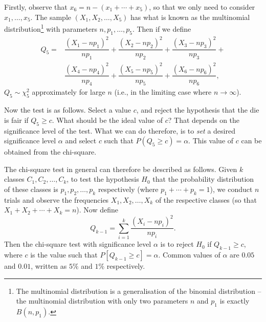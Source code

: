 \documentclass[svgnames, a5paper]{article}
\theoremstyle{definition}
\theoremstyle{remark}
\begin{document}
Firstly, observe that $x_6 = n - (x_1 + \cdots + x_5)$, so that we only need to consider $x_1, \ldots, x_5$. The sample $(X_1, X_2, \ldots, X_5)$ has what is known as the multinomial distribution\footnote{
	The multinomial distribution is a generalisation of the binomial distribution -- the multinomial distribution with only two parameters $n$ and $p_1$ is exactly $B(n, p_1)$.
} with parameters $n, p_1, \ldots, p_5$. Then if we define
\begin{align*}
Q_5 ={} &  \dfrac{(X_1 - np_1)^2}{np_1} + \dfrac{(X_2 - np_2)^2}{np_2} + \dfrac{(X_3 - np_3)^2}{np_3} + {}\\
 & \dfrac{(X_4 - np_4)^2}{np_4} + \dfrac{(X_5 - np_5)^2}{np_5} + \dfrac{(X_6 - np_6)^2}{np_6},
\end{align*}
$Q_5 \sim \chi^2_5$ approximately for large $n$ (i.e., in the limiting case where $n \to \infty$).

Now the test is as follows. Select a value $c$, and reject the hypothesis that the die is fair if $Q_5 \ge c$. What should be the ideal value of $c$? That depends on the significance level of the test. What we can do therefore, is to \emph{set} a desired significance level $\alpha$ and select $c$ such that $P(Q_5 \ge c) = \alpha$. This value of $c$ can be obtained from the chi-square.

The chi-square test in general can therefore be described as follows. Given $k$ classes $C_1, C_2, \ldots, C_k$, to test the hypothesis $H_0$ that the probability distribution of these classes is $p_1, p_2, \ldots, p_k$ respectively (where $p_1 + \cdots + p_k = 1$), we conduct $n$ trials and observe the frequencies $X_1, X_2, \ldots, X_k$ of the respective classes (so that $X_1 + X_2 + \cdots + X_k = n$). Now define
\begin{equation*}
Q_{k - 1} = \sum_{i=1}^{k} \dfrac{(X_i - np_i)^2}{np_i}.
\end{equation*}
Then the chi-square test with significance level $\alpha$ is to reject $H_0$ if $Q_{k - 1} \ge c$, where $c$ is the value such that $P[Q_{k - 1} \ge c] = \alpha$. Common values of $\alpha$ are $0.05$ and $0.01$, written as $5\%$ and $1\%$ respectively.
\end{document}
